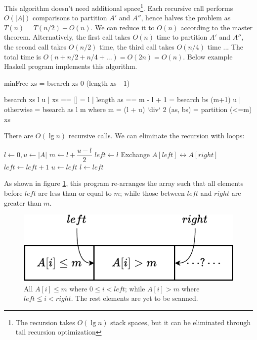 \documentclass[b5paper]{article}
\begin{document}
This algorithm doesn't need additional space\footnote{The recursion takes $O(\lg n)$ stack spaces, but it can be eliminated through tail recursion optimization}. Each recursive call performs $O(|A|)$ comparisons to partition $A'$ and $A''$, hence halves the problem as $T(n) = T(n/2) + O(n)$. We can reduce it to $O(n)$ according to the master theorem. Alternatively, the first call takes $O(n)$ time to partition $A'$ and $A''$, the second call takes $O(n/2)$ time, the third call takes $O(n/4)$ time ... The total time is $O(n + n/2 + n/4 + ...) = O(2n) = O(n)$. Below example Haskell program implements this algorithm.

\lstset{frame = single}
\begin{Haskell}
minFree xs = bsearch xs 0 (length xs - 1)

bsearch xs l u | xs == [] = l
               | length as == m - l + 1 = bsearch bs (m+1) u
               | otherwise = bsearch as l m
    where
      m = (l + u) `div` 2
      (as, bs) = partition (<=m) xs
\end{Haskell}

There are $O(\lg n)$ recursive calls. We can eliminate the recursion with loops:

\begin{algorithmic}[1]
  \State $l \gets 0, u \gets |A|$
    \State $m \gets l + \dfrac{u - l}{2}$
    \State $left \gets l$
        \State Exchange $A[left] \leftrightarrow A[right]$
        \State $left \gets left + 1$
      \EndIf
    \EndFor
      \State $u \gets left$
    \Else
      \State $l \gets left$
    \EndIf
  \EndWhile
\EndFunction
\end{algorithmic}

As shown in figure \cref{fig:divide}, this program re-arranges the array such that all elements before $left$ are less than or equal to $m$; while those between $left$ and $right$ are greater than $m$.

\begin{figure}[htbp]
  \centering
  \includegraphics[scale=0.7]{img/partition-by}
  \caption{All $A[i] \leq m$ where $0 \leq i < left$; while $A[i] > m$ where $left \leq i < right$. The rest elements are yet to be scanned.}
  \label{fig:divide}
\end{figure}
\end{document}
